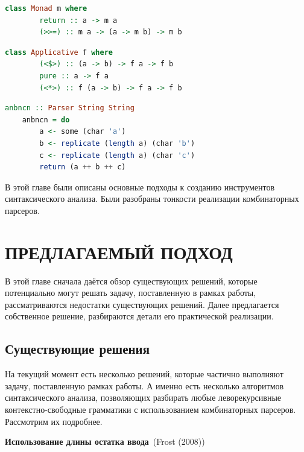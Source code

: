 \documentclass[times]{itmo-student-thesis}
\begin{document}
\begin{lstlisting}[language=Haskell,float=!h,caption={Класс монад в Haskell},label={lst:monad_typeclass}]
    class Monad m where
        return :: a -> m a
        (>>=) :: m a -> (a -> m b) -> m b
\end{lstlisting}

\begin{lstlisting}[language=Haskell,caption={Класс аппликативов в Haskell},label={lst:applicative_typeclass}]
    class Applicative f where
        (<$>) :: (a -> b) -> f a -> f b
        pure :: a -> f a
        (<*>) :: f (a -> b) -> f a -> f b
\end{lstlisting}

\begin{lstlisting}[language=Haskell,caption={Монадический парсер для не КС языка},label={lst:non_context_free}]
    anbncn :: Parser String String
    anbncn = do
        a <- some (char 'a')
        b <- replicate (length a) (char 'b')
        c <- replicate (length a) (char 'c')
        return (a ++ b ++ c)
\end{lstlisting}

\chapterconclusion

В этой главе были описаны основные подходы к созданию инструментов синтаксического анализа. Были разобраны тонкости реализации 
комбинаторных парсеров.

\chapter{ПРЕДЛАГАЕМЫЙ ПОДХОД}

В этой главе сначала даётся обзор существующих решений, которые потенциально могут решать задачу, поставленную в рамках 
работы, рассматриваются недостатки существующих решений. Далее предлагается собственное решение, разбираются детали его
практической реализации.

\section{Существующие решения}\label{sec:existing_solutions}

На текущий момент есть несколько решений, которые частично выполняют задачу, поставленную рамках работы. А именно есть
несколько алгоритмов синтаксического анализа, позволяющих разбирать любые леворекурсивные контекстно-свободные грамматики с
использованием комбинаторных парсеров. Рассмотрим их подробнее.

\textbf{Использование длины остатка ввода}~(Frost (2008)\cite{hudak_parser_2008})
\end{document}
